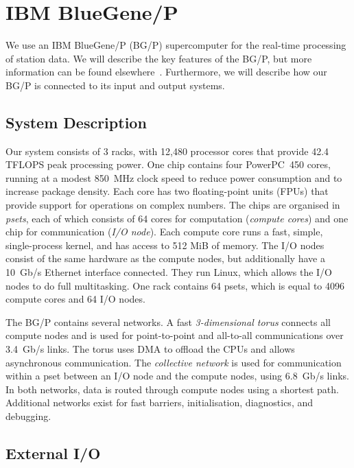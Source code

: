 \documentclass{llncs}
\begin{document}
\section{IBM BlueGene/P}
\label{Sec:bluegene}

We use an IBM BlueGene/P (BG/P) supercomputer for the real-time processing of station data. We will describe the key features of the BG/P, but more information can be found elsewhere~\cite{IBM:08}. Furthermore, we will describe how our BG/P is connected to its input and output systems.

\subsection{System Description}

Our system consists of 3 racks, with 12,480 processor cores that provide 42.4 TFLOPS peak processing power. One chip contains four PowerPC~450 cores, running at a modest 850~MHz clock speed to reduce power consumption and to increase package density. Each core has two floating-point units (FPUs) that provide support for operations on complex numbers. The chips are organised in \emph{psets}, each of which consists of 64 cores for computation (\emph{compute cores}) and one chip for communication (\emph{I/O node}). Each compute core runs a fast, simple, single-process kernel,  and has access to 512 MiB of memory. The I/O nodes consist of the same hardware as the compute nodes, but additionally have a 10~Gb/s Ethernet interface connected. They run Linux, which allows the I/O nodes to do full multitasking. One rack contains 64 psets, which is equal to 4096 compute cores and 64 I/O nodes.

The BG/P contains several networks. A fast \emph{3-dimensional torus\/} connects all compute nodes and is used for point-to-point and all-to-all communications over 3.4~Gb/s links. The torus uses DMA to offload the CPUs and allows asynchronous communication. The \emph{collective network\/} is used for communication within a pset between an I/O node and the compute nodes, using 6.8~Gb/s links. In both networks, data is routed through compute nodes using a shortest path. Additional networks exist for fast barriers, initialisation, diagnostics, and debugging.

\subsection{External I/O}
\label{Sec:Networks}
\end{document}
